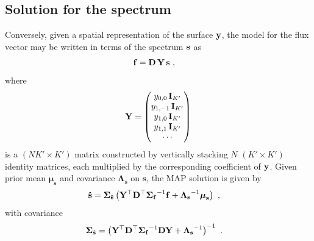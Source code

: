 \documentclass[modern]{aastex631}
\begin{document}
\subsection{Solution for the spectrum}
\label{sec:solve_s}
%
Conversely, given a spatial representation of the surface ${\mathbf{y}}$, the model for the flux vector may be written in terms of the spectrum ${\mathbf{s}}$ as
%
\begin{align}
    \label{eq:inverse:fs}
    {\ensuremath{\mathbf{f}}}
     & =
    {\mathbf{D}}
    \,
    {\mathbf{Y}}
    \,
    {\mathbf{s}}
    \hskip 0.33em,
\end{align}
%
where
%
\begin{align}
    \label{eq:inverse:Y}
    {\ensuremath{\mathbf{Y}}} =
    \begin{pmatrix}
        y_{0,0}\, {\mathbf{I}}_{K'} \\
        y_{1,-1}\, {\mathbf{I}}_{K'} \\
        y_{1,0}\, {\mathbf{I}}_{K'} \\
        y_{1,1}\, {\mathbf{I}}_{K'} \\
        \cdots
    \end{pmatrix}
\end{align}
%
is a $(NK' \times K')$ matrix constructed by vertically stacking $N$ $(K' \times K')$ identity matrices, each multiplied by the corresponding coefficient of ${\mathbf{y}}$. 
Given prior mean $\boldsymbol{\mu}_\mathbf{s}$ and covariance $\boldsymbol{\Lambda}_\mathbf{s}$ on $\mathbf{s}$, the MAP solution is given by
%
\begin{align}
    \label{eq:inverse:shat}
    {\ensuremath{\mathbf{\hat{s}}}} & =
    \boldsymbol{\Sigma}_\mathbf{\hat{s}}
    \left(
    {\mathbf{Y}}^\top{\ensuremath{\mathbf{D}}}^\top
    {\boldsymbol{\Sigma}_\mathbf{f}}^{-1}
    {\mathbf{f}}
    +
    {\boldsymbol{\Lambda}_\mathbf{s}}^{-1} \boldsymbol{\mu}_\mathbf{s}
    \right)
    \hskip 0.33em,
\end{align}
%
with covariance
%
\begin{align}
    \label{eq:inverse:scov}
    \boldsymbol{\Sigma}_\mathbf{\hat{s}} & =
    \left(
    {\mathbf{Y}}^\top{\ensuremath{\mathbf{D}}}^\top
    {\boldsymbol{\Sigma}_\mathbf{f}}^{-1}
    {\mathbf{D}}{\mathbf{Y}}
    +
    {\boldsymbol{\Lambda}_\mathbf{s}}^{-1}
    \right)^{-1}
    \hskip 0.33em.
\end{align}
\end{document}

